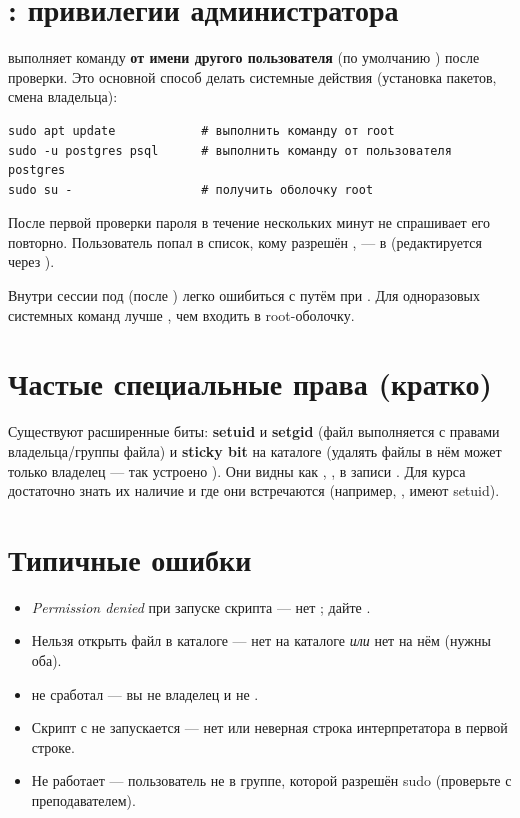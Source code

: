\section{: привилегии администратора}

 выполняет команду \textbf{от имени другого пользователя}
(по умолчанию ) после проверки. Это основной способ
делать системные действия (установка пакетов, смена владельца):
\begin{verbatim}
sudo apt update            # выполнить команду от root
sudo -u postgres psql      # выполнить команду от пользователя postgres
sudo su -                  # получить оболочку root
\end{verbatim}

После первой проверки пароля в течение нескольких минут
 не спрашивает его повторно. Пользователь
попал в список, кому разрешён , --- в
 (редактируется через ).

\begin{warnbox}
Внутри сессии под  (после )
легко ошибиться с путём при . Для одноразовых
системных команд лучше ,
чем входить в root-оболочку.
\end{warnbox}

\section{Частые специальные права (кратко)}

Существуют расширенные биты:
\textbf{setuid} и \textbf{setgid} (файл выполняется
с правами владельца/группы файла) и \textbf{sticky bit}
на каталоге (удалять файлы в нём может только владелец ---
так устроено ). Они видны как , ,
 в записи . Для курса достаточно знать их
наличие и где они встречаются (например, , 
имеют setuid).

\section{Типичные ошибки}
\begin{itemize}
  \item \emph{Permission denied} при запуске скрипта --- нет ;
    дайте .
  \item Нельзя открыть файл в каталоге --- нет  на каталоге
    \emph{или} нет  на нём (нужны оба).
  \item {} не сработал --- вы не владелец и не .
  \item Скрипт с  не запускается --- нет 
    или неверная строка интерпретатора в первой строке.
  \item Не работает  --- пользователь не в группе,
    которой разрешён sudo (проверьте с преподавателем).
\end{itemize}

